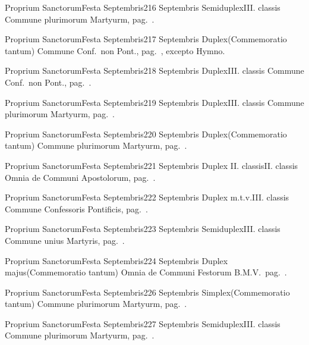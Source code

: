\documentclass[nocturnale-romanum.tex]{subfiles}
\begin{document}
	{Proprium Sanctorum}{Festa Septembris}{2}{16 Septembris}
	{Semiduplex}{III. classis}
	{Commune plurimorum Martyurm, pag.\ \pageref{M-PMEX}.}
	{}

	{Proprium Sanctorum}{Festa Septembris}{2}{17 Septembris}
	{Duplex}{(Commemoratio tantum)}
	{Commune Conf.\ non Pont., pag.\ \pageref{M-CONP}, excepto Hymno.}
	{}

	{Proprium Sanctorum}{Festa Septembris}{2}{18 Septembris}
	{Duplex}{III. classis}
	{Commune Conf.\ non Pont., pag.\ \pageref{M-CONP}.}
	{}

	{Proprium Sanctorum}{Festa Septembris}{2}{19 Septembris}
	{Duplex}{III. classis}
	{Commune plurimorum Martyurm, pag.\ \pageref{M-PMEX}.}
	{}

	{Proprium Sanctorum}{Festa Septembris}{2}{20 Septembris}
	{Duplex}{(Commemoratio tantum)}
	{Commune plurimorum Martyurm, pag.\ \pageref{M-PMEX}.}
	{}

	{Proprium Sanctorum}{Festa Septembris}{2}{21 Septembris}
	{Duplex II. classis}{II. classis}
	{Omnia de Communi Apostolorum, pag.\ \pageref{M-APEX}.}
	{}

	{Proprium Sanctorum}{Festa Septembris}{2}{22 Septembris}
	{Duplex m.t.v.}{III. classis}
	{Commune Confessoris Pontificis, pag.\ \pageref{M-COPO}.}
	{}

	{Proprium Sanctorum}{Festa Septembris}{2}{23 Septembris}
	{Semiduplex}{III. classis}
	{Commune unius Martyris, pag.\ \pageref{M-UMEX}.}
	{}

	{Proprium Sanctorum}{Festa Septembris}{2}{24 Septembris}
	{Duplex majus}{(Commemoratio tantum)}
	{Omnia de Communi Festorum B.M.V.\ pag.\ \pageref{M-CBMV}.}
	{}

	{Proprium Sanctorum}{Festa Septembris}{2}{26 Septembris}
	{Simplex}{(Commemoratio tantum)}
	Commune plurimorum Martyurm, pag.\ \pageref{M-PMEX}.{}
	{}

	{Proprium Sanctorum}{Festa Septembris}{2}{27 Septembris}
	{Semiduplex}{III. classis}
	{Commune plurimorum Martyurm, pag.\ \pageref{M-PMEX}.}
	{}
\end{document}

